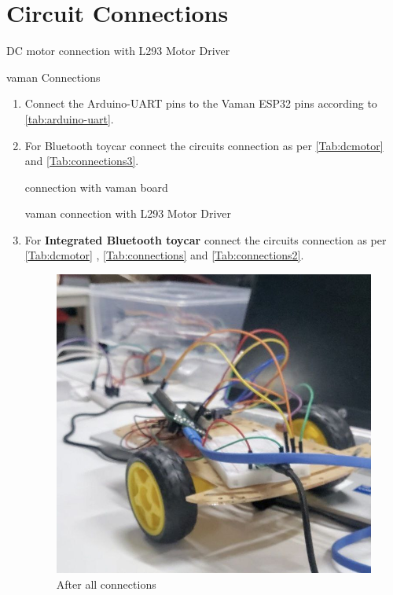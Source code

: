 \section{Circuit Connections}

\begin{table}[!ht]
\centering
	
	\caption{DC motor connection with L293 Motor Driver }
	\label{Tab:dcmotor}
\end{table}

\begin{table}[!ht]
\centering
	
	\caption{ vaman Connections}
	\label{Tab:connections3}
\end{table}
\begin{enumerate}
\item Connect the Arduino-UART pins to the Vaman ESP32 pins according to \autoref{tab:arduino-uart}.
\item For Bluetooth toycar connect the circuits connection as per \autoref{Tab:dcmotor} and  \autoref{Tab:connections3}.
\begin{table}[!ht]
\centering
	
	\caption{connection with vaman board }
	\label{Tab:connections}
\end{table}
\begin{table}[!ht]
\centering
	
	\caption{vaman connection with L293 Motor Driver}
	\label{Tab:connections2}
\end{table}
\item For \textbf{Integrated Bluetooth toycar} connect the circuits connection
as per \autoref{Tab:dcmotor} , \autoref{Tab:connections} and
\autoref{Tab:connections2}.

\begin{figure}[!ht]
\centering
\includegraphics[width=0.3\columnwidth]{ugv/figs/8.jpg}
\caption{After all connections}
\end{figure}
\end{enumerate}

